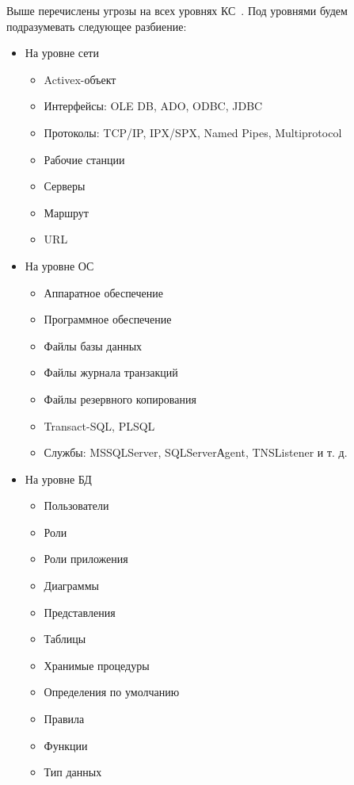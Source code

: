 Выше перечислены угрозы на всех уровнях КС~\label{pon:urovs}. Под уровнями будем подразумевать следующее разбиение:
\begin{itemize}
	\item На уровне сети
	\begin{itemize}
		\item Activex-объект
		\item Интерфейсы: OLE DB, ADO, ODBC, JDBC
		\item Протоколы: TCP/IP, IPX/SPX, Named Pipes, Multiprotocol
		\item Рабочие станции
		\item Серверы
		\item Маршрут
		\item URL
	\end{itemize}
	\item На уровне ОС
	\begin{itemize}
		\item Аппаратное обеспечение
		\item Программное обеспечение
		\item Файлы базы данных
		\item Файлы журнала транзакций
		\item Файлы резервного копирования
		\item Transact-SQL, PLSQL
		\item Службы: MSSQLServer, SQLServerАgent, TNSListener и т. д.
	\end{itemize}
	\item На уровне БД
	\begin{itemize}
		\item Пользователи
		\item Роли
		\item Роли приложения
		\item Диаграммы
		\item Представления
		\item Таблицы
		\item Хранимые процедуры
		\item Определения по умолчанию
		\item Правила
		\item Функции
		\item Тип данных
	\end{itemize}
\end{itemize}

